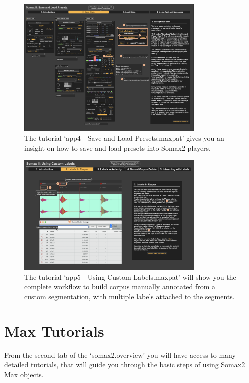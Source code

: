  \begin{figure}[H]
    \centering        
 	\includegraphics[width=0.8\textwidth]{img/app4_presets.png}
    \caption{The tutorial `app4 - Save and Load Presets.maxpat' gives you an insight on how to save and load presets into Somax2 players.}
    \label{fig:app4_presets}
\end{figure}

 \begin{figure}[H]
    \centering        
 	\includegraphics[width=0.8\textwidth]{img/app5_label_tutorial.png}
    \caption{The tutorial `app5 - Using Custom Labels.maxpat' will show you the complete workflow to build corpus manually annotated from a custom segmentation, with multiple labels attached to the segments.}
    \label{fig:app5_labels}
\end{figure}



\section{Max Tutorials}

From the second tab of the `somax2.overview' you will have access to many detailed tutorials, that will guide you through the basic steps of using Somax2 Max objects. 

